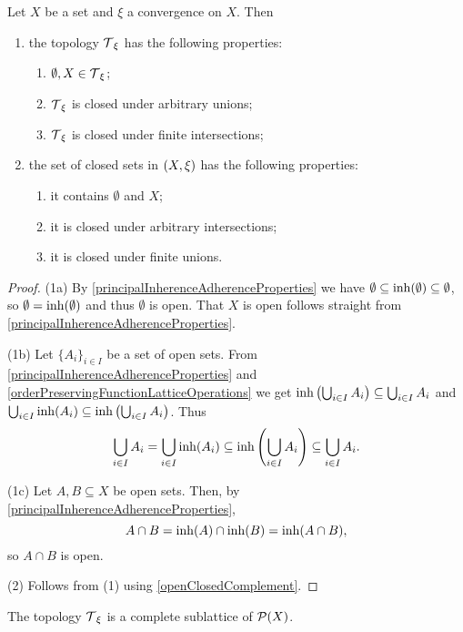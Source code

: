 \begin{proposition} \label{propertiesTopology}
Let $X$ be a set and $\xi$ a convergence on $X$. Then
\begin{enumerate}
\item the topology $\operatorname{\mathcal{T}}_\xi$ has the following properties:
\begin{enumerate}
\item $\emptyset, X\in \operatorname{\mathcal{T}}_\xi$;
\item $\operatorname{\mathcal{T}}_\xi$ is closed under arbitrary unions;
\item $\operatorname{\mathcal{T}}_\xi$ is closed under finite intersections;
\end{enumerate}
\item the set of closed sets in $\sSet{X,\xi}$ has the following properties:
\begin{enumerate}
\item it contains $\emptyset$ and $X$;
\item it is closed under arbitrary intersections;
\item it is closed under finite unions.
\end{enumerate}
\end{enumerate}
\end{proposition}
\begin{proof}
(1a) By \ref{principalInherenceAdherenceProperties} we have $\emptyset \subseteq \operatorname{inh}(\emptyset) \subseteq \emptyset$, so $\emptyset = \operatorname{inh}(\emptyset)$ and thus $\emptyset$ is open. That $X$ is open follows straight from \ref{principalInherenceAdherenceProperties}.

(1b) Let $\{A_i\}_{i\in I}$ be a set of open sets. From \ref{principalInherenceAdherenceProperties} and \ref{orderPreservingFunctionLatticeOperations} we get $\operatorname{inh}\left(\bigcup_{i\in I}A_i\right) \subseteq \bigcup_{i\in I}A_i$ and $\bigcup_{i\in I}\operatorname{inh}(A_i) \subseteq \operatorname{inh}\left(\bigcup_{i\in I} A_i\right)$. Thus
\[ \bigcup_{i\in I}A_i  = \bigcup_{i\in I}\operatorname{inh}(A_i) \subseteq \operatorname{inh}\left(\bigcup_{i\in I} A_i\right) \subseteq \bigcup_{i\in I}A_i. \]

(1c) Let $A, B\subseteq X$ be open sets. Then, by \ref{principalInherenceAdherenceProperties},
\[ A\cap B = \operatorname{inh}(A)\cap \operatorname{inh}(B) = \operatorname{inh}(A\cap B), \]
so $A\cap B$ is open.

(2) Follows from (1) using \ref{openClosedComplement}.
\end{proof}
\begin{corollary}
The topology $\operatorname{\mathcal{T}}_\xi$ is a complete sublattice of $\operatorname{\mathcal{P}}(X)$.
\end{corollary}




